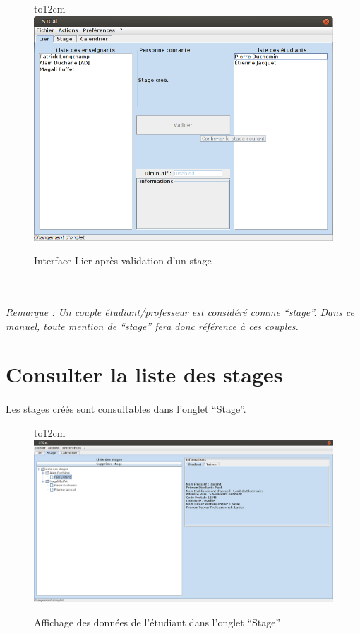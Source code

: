 \documentclass[a4paper,10pt]{report}
\begin{document}
	\begin{figure}[H]
	  \hbox to12cm{\hss\includegraphics[width=14cm]{../general/valide.png}\hss}
	  \caption{Interface Lier après validation d'un stage}
	\end{figure}
	~\\	  
	  
	\paragraph{}
	  \textit{Remarque : Un couple étudiant/professeur est considéré comme ``stage''. Dans ce manuel, toute mention de ``stage'' fera donc référence à ces couples.}
	  \newpage
    \section{Consulter la liste des stages}
      \paragraph{}
	Les stages créés sont consultables dans l'onglet ``Stage''.
	~\\
	
	\begin{figure}[H]
	  \hbox to12cm{\hss\includegraphics[width=18cm]{../general/Stage.png}\hss}
	  \caption{Affichage des données de l'étudiant dans l'onglet ``Stage''}
	\end{figure}
	~\\	
	
\end{document}
